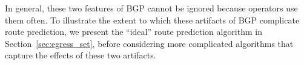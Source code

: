 In general, these two features of BGP cannot be ignored because
operators use them often.  To illustrate the extent to which these
artifacts of BGP complicate route prediction, we present the ``ideal''
route prediction algorithm in Section~\ref{sec:egress_set}, before
considering more complicated algorithms that capture the effects of
these two artifacts.


